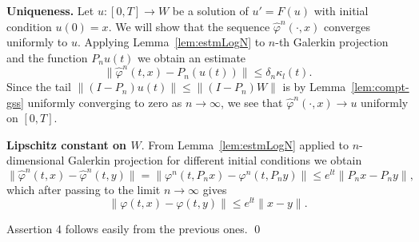 \textbf{Uniqueness.}
Let $u:[0,T] \to W$ be a solution of $u'=F(u)$ with initial condition $u(0)=x$. We will show that the sequence $\widehat \varphi^n(\cdot,x)$ converges uniformly to $u$. Applying Lemma~\ref{lem:estmLogN} to $n$-th Galerkin projection and the function $P_n u(t)$ we obtain an estimate
\begin{equation*}
  \|\widehat \varphi^n(t,x) - P_n(u(t))\| \leq  \delta_n \kappa_l(t).
\end{equation*}
Since the tail $\|(I-P_n)u(t)\| \leq \|(I-P_n)W\|$ is by Lemma~\ref{lem:compt-gss} uniformly converging to zero as $n\to \infty $, we see that $\widehat\varphi^n(\cdot,x) \to u$ uniformly on $[0,T]$.


\textbf{Lipschitz constant on $W$}. From Lemma~\ref{lem:estmLogN} applied to $n$-dimensional Galerkin projection for different initial conditions we obtain
\begin{equation*}
\|\widehat\varphi^n(t,x)-\widehat \varphi^n(t,y)\| =  \|\varphi^n(t,P_nx)-\varphi^n(t,P_ny)\| \leq e^{lt}\|P_n x - P_n y\|,
\end{equation*}
which after passing to the limit $n\to\infty$ gives
\begin{equation*}
  \|\varphi(t,x)-\varphi(t,y)\| \leq e^{lt}\|x - y\|.
\end{equation*}

Assertion 4 follows easily from the previous ones. \qed
